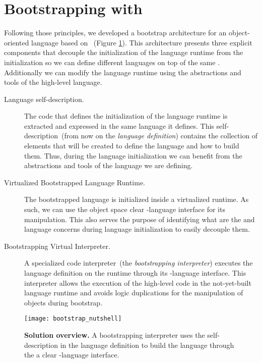 \section{Bootstrapping with \Vtt}

Following those principles, we developed a bootstrap architecture for an object-oriented language based on \Vtt~(Figure \ref{fig:bootstrapping_overview}). This architecture presents three explicit components that decouple the initialization of the language runtime from the \VM initialization so we can define different languages on top of the same \VM. Additionally we can modify the language runtime using the abstractions and tools of the high-level language.

\begin{description}
\item[Language self-description.] The code that defines the initialization of the language runtime is extracted and expressed in the same language it defines. This self-description~(from now on the \emph{language definition}) contains the collection of elements that will be created to define the language and how to build them. Thus, during the language initialization we can benefit from the abstractions and tools of the language we are defining.
\item[Virtualized Bootstrapped Language Runtime.] The bootstrapped language is initialized inside a virtualized runtime. As such, we can use the object space clear \VM-language interface for its manipulation. This also serves the purpose of identifying what are the \VM and language concerns during language initialization to easily decouple them.
\item[Bootstrapping Virtual Interpreter.] A specialized code interpreter~(the \emph{bootstrapping interpreter}) executes the language definition on the runtime through its \VM-language interface. This interpreter allows the execution of the high-level code in the not-yet-built language runtime and avoids logic duplications for the manipulation of objects during bootstrap.
\end{description}

\begin{figure}[ht]
\center
\texttt{[image: bootstrap\_nutshell]}
\caption{\textbf{Solution overview.} A bootstrapping interpreter uses the self-description in the language definition to build the language through the a clear \VM-language interface.\label{fig:bootstrapping_overview}}
\end{figure}

